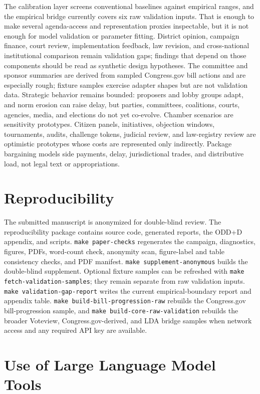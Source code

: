 \documentclass[manuscript,review,anonymous]{acmart}
\begin{document}
The calibration layer screens conventional baselines against empirical ranges, and the empirical bridge currently covers six raw validation inputs. That is enough to make several agenda-access and representation proxies inspectable, but it is not enough for model validation or parameter fitting. District opinion, campaign finance, court review, implementation feedback, law revision, and cross-national institutional comparison remain validation gaps; findings that depend on those components should be read as synthetic design hypotheses. The committee and sponsor summaries are derived from sampled Congress.gov bill actions and are especially rough; fixture samples exercise adapter shapes but are not validation data. Strategic behavior remains bounded: proposers and lobby groups adapt, and norm erosion can raise delay, but parties, committees, coalitions, courts, agencies, media, and elections do not yet co-evolve. Chamber scenarios are sensitivity prototypes. Citizen panels, initiatives, objection windows, tournaments, audits, challenge tokens, judicial review, and law-registry review are optimistic prototypes whose costs are represented only indirectly. Package bargaining models side payments, delay, jurisdictional trades, and distributive load, not legal text or appropriations.

\section{Reproducibility}

The submitted manuscript is anonymized for double-blind review. The reproducibility package contains source code, generated reports, the ODD+D appendix, and scripts. \texttt{make paper-checks} regenerates the campaign, diagnostics, figures, PDFs, word-count check, anonymity scan, figure-label and table consistency checks, and PDF manifest. \texttt{make supplement-anonymous} builds the double-blind supplement. Optional fixture samples can be refreshed with \texttt{make fetch-validation-samples}; they remain separate from raw validation inputs. \texttt{make validation-gap-report} writes the current empirical-boundary report and appendix table. \texttt{make build-bill-progression-raw} rebuilds the Congress.gov bill-progression sample, and \texttt{make build-core-raw-validation} rebuilds the broader Voteview, Congress.gov-derived, and LDA bridge samples when network access and any required API key are available.

\section*{Use of Large Language Model Tools}
\end{document}
